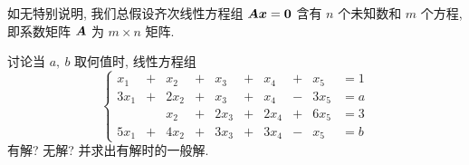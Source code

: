 如无特别说明, 我们总假设齐次线性方程组 $ \vb*{A x}=\vb*{0} $ 含有 $ n $ 个未知数和 $ m $ 个方程, 即系数矩阵 $ \vb*{A }$ 为 $ m \times n $ 矩阵.

\begin{example}
    讨论当 $a,~b$ 取何值时, 线性方程组 $$\left\{\begin{matrix}
            x_1  & + & x_2  & + & x_3  & + & x_4  & + & x_5  & =1 \\
            3x_1 & + & 2x_2 & + & x_3  & + & x_4  & - & 3x_5 & =a \\
                 &   & x_2  & + & 2x_3 & + & 2x_4 & + & 6x_5 & =3 \\
            5x_1 & + & 4x_2 & + & 3x_3 & + & 3x_4 & - & x_5  & =b
        \end{matrix}\right.$$有解? 无解? 并求出有解时的一般解.
\end{example}
